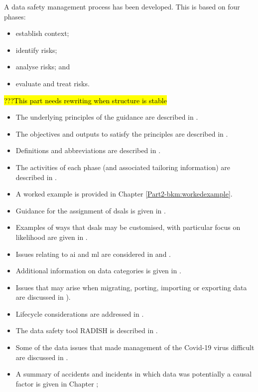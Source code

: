 A data safety management process has been developed. This is based on four phases:
\begin{itemize}
	\item establish context;
	\item identify risks;
	\item analyse risks; and
	\item evaluate and \gls{treat} risks.
\end{itemize}
\hl{???This part needs rewriting when structure is stable}
\cbstart
\begin{itemize}
	\item The underlying principles of the guidance are described in .
	\item The objectives and outputs to satisfy the principles are described in .
	\item Definitions and abbreviations are described in .
	\item The activities of each phase (and associated \gls{tailoring} \gls{information}) are described in .
	\item A worked example is provided in Chapter \ref*{Part2-bkm:workedexample}.
	\item Guidance for the assignment of \glspl{dsal} is given in .
	\item Examples of ways that \glspl{dsal} may be customised, with particular focus on likelihood are given in .
	\item Issues relating to \gls{ai} and \gls{ml} are considered in  and .
	\item Additional information on data categories is given in .
	\item Issues that may arise when migrating, porting, importing or exporting data are discussed in ).            
	\item Lifecycle considerations are addressed in .
	\item The data safety tool RADISH is described in .
	\item Some of the data issues that made management of the Covid-19 virus difficult are discussed in .
	\item A summary of accidents and incidents in which data was potentially a causal factor is given in Chapter ;
\cbend
\end{itemize}

